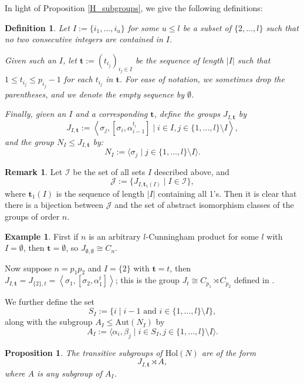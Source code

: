 \documentclass[a4paper,reqno]{amsart}
\newtheorem{proposition}[theorem]{Proposition}
\newtheorem{definition}[theorem]{Definition}
\theoremstyle{definition}
\newtheorem{remark}[theorem]{Remark}
\newtheorem{example}[theorem]{Example}
\newcommand{\bt}{\textbf{t}}
\newcommand{\Aut}{\mathrm{Aut}}
\newcommand{\Hol}{\mathrm{Hol}}
\begin{document}
In light of Proposition \ref{H_subgroups}, we give the following definitions:
\begin{definition}
    Let $I:=\{i_1,\ldots,i_u\}$ for some $u \leq l$ be a subset of $\{2,\ldots,l\}$ such that no two consecutive integers are contained in $I$.

    Given such an $I$, let $\bt:=(t_{i_j})_{i_j \in I}$ be the sequence of length $|I|$ such that $1 \leq t_{i_j} \leq p_{i_j}-1$ for each $t_{i_j}$ in $\bt$. For ease of notation, we sometimes drop the parentheses, and we denote the empty sequence by $\emptyset$.

    Finally, given an $I$ and a corresponding $\bt$, define the groups $J_{I,\bt}$ by
    \[J_{I,\bt}:=\left\langle \sigma_j, \left[\sigma_i,\alpha_{i-1}^{t_i}\right] \mid i \in I, j \in \{1,\ldots,l\}\setminus I \right\rangle,\]
    and the group $N_I \leq J_{I,\bt}$ by:
    \[N_I:=\langle \sigma_j \mid j \in \{1,\ldots,l\} \setminus I \rangle.\]
\end{definition}
\begin{remark}\label{gps_order_n}
    Let $\mathcal{I}$ be the set of all sets $I$ described above, and
    \[\mathcal{J}:=\{J_{I,\bt_1(I)} \mid I \in \mathcal{I}\},\]
    where $\bt_1(I)$ is the sequence of length $|I|$ containing all 1's. Then it is clear that there is a bijection between $\mathcal{J}$ and the set of abstract isomorphism classes of the groups of order $n$.
\end{remark}
\begin{example}\label{subset_examples}
    First if $n$ is an arbitrary $l$-Cunningham product for some $l$ with $I=\emptyset$, then $\bt=\emptyset$, so  $J_{\emptyset,\emptyset}\cong C_n$.
    
    Now suppose $n=p_1p_2$ and $I=\{2\}$ with $\bt=t$, then $J_{I,\bt} = J_{\{2\},t}= \left\langle \sigma_1, \left[\sigma_2,\alpha_1^t\right]\right\rangle$; this is the group $J_t \cong C_{p_1} \rtimes C_{p_2}$ defined in \cite{BML21}.
\end{example}
We further define the set
\[S_I:=\{i \mid i-1 \text{ and } i \in \{1,\ldots,l\}\setminus I\},\]
along with the subgroup $A_I \leq \Aut(N_I)$ by
\[A_I:=\langle \alpha_i,\beta_j \mid i \in S_I, j \in \{1,\ldots,l\} \setminus I \rangle.\]
\begin{proposition}\label{cyclic_trans}
    The transitive subgroups of $\Hol(N)$ are of the form
    \[J_{I,\bt} \rtimes A,\]
    where $A$ is any subgroup of $A_I$.
\end{proposition}
\end{document}

